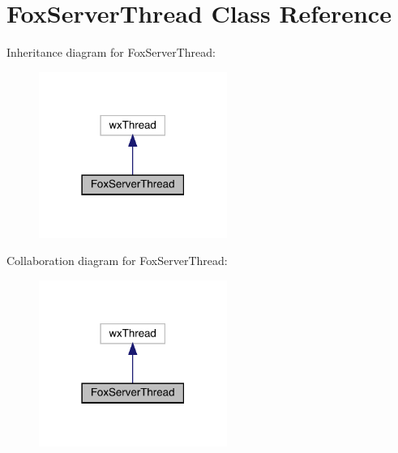 \hypertarget{class_fox_server_thread}{}\section{Fox\+Server\+Thread Class Reference}
\label{class_fox_server_thread}


Inheritance diagram for Fox\+Server\+Thread\+:
\nopagebreak
\begin{figure}[H]
\begin{center}
\leavevmode
\includegraphics[width=174pt]{class_fox_server_thread__inherit__graph}
\end{center}
\end{figure}


Collaboration diagram for Fox\+Server\+Thread\+:
\nopagebreak
\begin{figure}[H]
\begin{center}
\leavevmode
\includegraphics[width=174pt]{class_fox_server_thread__coll__graph}
\end{center}
\end{figure}
